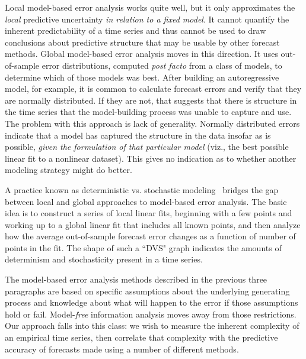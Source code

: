 Local model-based error analysis works quite well, but it only
approximates the \emph{local} predictive uncertainty \emph{in relation
  to a fixed model}.  It cannot quantify the inherent predictability
of a time series and thus cannot be used to draw conclusions about
predictive structure that may be usable by other forecast methods.
%
%
Global model-based error analysis moves in this direction.  It uses
out-of-sample error distributions, computed \emph{post facto} from a
class of models, to determine which of those models was best.  After
building an autoregressive model, for example, it is common to
calculate forecast errors and verify that they are normally distributed.
If they are not, that suggests that there is structure in the time
series that the model-building process was unable to capture and use.
The problem with this approach is lack of generality.
\label{page:normal-errors}
Normally distributed errors indicate that a model has captured the
structure in the data insofar as is possible, \emph{given the
  formulation of that particular model} (viz., the best possible
linear fit to a nonlinear dataset).  This gives no indication as to
whether another modeling strategy might do better.


A practice known as deterministic vs. stochastic
modeling~\cite{weigend93, Casdagli92dvsplots} bridges the gap
between local and global approaches to model-based error analysis.
The basic idea is to construct a series of local linear fits,
beginning with a few points and working up to a global linear fit that
includes all known points, and then analyze how the average
out-of-sample forecast error changes as a function of number of points
in the fit. The shape of such a ``DVS" graph indicates the amounts of
determinism and stochasticity present in a time series.

The model-based error analysis methods described in the previous three
paragraphs are based on specific assumptions about the underlying
generating process and knowledge about what will happen to the error
if those assumptions hold or fail.  Model-\emph{free} information
analysis moves away from those restrictions.  Our approach falls into
this class: we wish to measure the inherent complexity of an empirical
time series, then correlate that complexity with the predictive
accuracy of forecasts made using a number of different methods.

